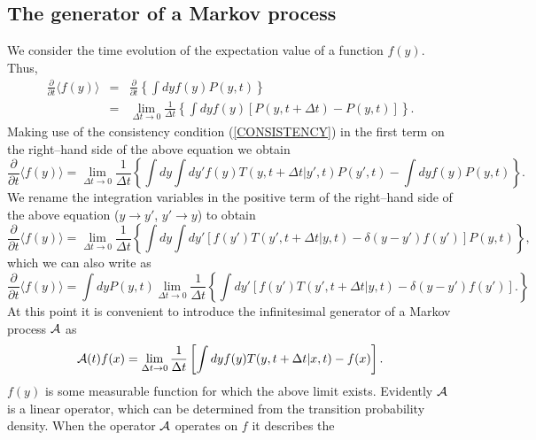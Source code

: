 \subsection{The generator of a Markov process}
We consider the time evolution of the expectation value
of  a function $f(y)$.
Thus,
\begin{eqnarray*}
\frac{\partial}{\partial t} \langle f(y) \rangle &=&
 \frac{\partial}{\partial t} 
    \left\{  \int dy f(y) P(y,t)  \right\}  \\
 &= & \lim_{\Delta t \rightarrow 0} \frac{1}{\Delta t}
       \left\{  \int dy f(y) \left[P(y,t+\Delta t) - P(y,t) \right]  
       \right\}.
\end{eqnarray*}
Making use of the consistency condition (\ref{CONSISTENCY}) 
in the first term 
on the right--hand side of the above equation we obtain
\begin{equation*}
\frac{\partial}{\partial t} \langle f(y) \rangle =
   \lim_{\Delta t \rightarrow 0} \frac{1}{\Delta t}
    \left\{  \int dy \int dy' f(y) T(y,t+\Delta t|y',t) P(y',t) 
         - \int dy f(y) P(y,t) 
       \right\}.
\end{equation*}
We rename the integration variables in the positive 
term of the right--hand side of the above equation ($y \rightarrow y'$,
$y' \rightarrow y$) to obtain
\begin{equation*}
\frac{\partial}{\partial t} \langle f(y) \rangle =
   \lim_{\Delta t \rightarrow 0} \frac{1}{\Delta t}
    \left\{  \int dy  \int dy' \left[ f(y') T(y',t+\Delta t|y,t) 
         - \delta(y-y') f(y') \right] P(y,t) 
       \right\},
\end{equation*}
which we can also write as
\begin{equation*}
\frac{\partial}{\partial t} \langle f(y) \rangle =
\int dy P(y,t) \lim_{\Delta t \rightarrow 0} \frac{1}{\Delta t}
\left\{ \int dy' \left[ f(y') T(y',t+\Delta t|y,t) 
         - \delta(y-y') f(y') \right].
\right\}
\end{equation*}
At this point it is convenient to introduce the infinitesimal 
generator of a Markov process ${\cal{A}}$ as
\begin{equation}
\label{DEF_GENERATOR}
{\cal{A}}(t) f(x) = \lim_{\Delta t \rightarrow 0}
    \frac{1}{\Delta t} 
    \left[\int dy f(y)T(y,t+\Delta t|x,t) - f(x)  \right].
\end{equation}
$f(y)$ is some measurable function for which the above 
limit exists. Evidently ${\cal{A}}$ is a linear operator, which 
can be determined from the transition probability density. 
When the operator ${\cal{A}}$ operates on $f$ it describes the
